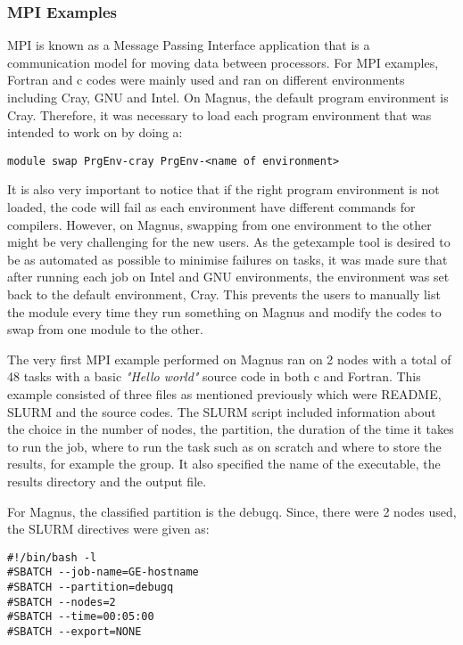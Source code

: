 \subsubsection{MPI Examples}

MPI is known as a Message Passing Interface application that is a communication model for moving data between processors. For MPI examples, Fortran and 
c codes were mainly used and ran on different environments including Cray, GNU and Intel. On Magnus, the default program environment is Cray. Therefore, 
it was necessary to load each program environment that was intended to work on by doing a:

\begin{tcolorbox}
\begin{Verbatim}[fontsize=\scriptsize]
module swap PrgEnv-cray PrgEnv-<name of environment>
\end{Verbatim}
\end{tcolorbox}

It is also very important to notice that if the right program environment is not loaded, the code will fail as each environment have different commands 
for compilers. However, on Magnus, swapping from one environment to the other might be very challenging for the new users. As the getexample tool is
desired to be as automated as possible to minimise failures on tasks, it was made sure that after running each job on Intel and GNU environments, the
environment was set back to the default environment, Cray. This prevents the users to manually list the module every time they run something on Magnus
and modify the codes to swap from one module to the other. 

The very first MPI example performed on Magnus ran on 2 nodes with a total of 48 tasks with a basic \emph{"Hello world"} source code in both c and Fortran. 
This example consisted of three files as mentioned previously which were README, SLURM and the source codes. The SLURM script included information about
the choice in the number of nodes, the partition, the duration of the time it takes to run the job, where to run the task such as on scratch and where
to store the results, for example the group. It also specified the name of the executable, the results directory and the output file. 

For Magnus, the classified partition is the debugq. Since, there were 2 nodes used, the SLURM directives were given as:

\begin{tcolorbox}
\begin{Verbatim}[fontsize=\scriptsize]
#!/bin/bash -l
#SBATCH --job-name=GE-hostname
#SBATCH --partition=debugq
#SBATCH --nodes=2
#SBATCH --time=00:05:00
#SBATCH --export=NONE
\end{Verbatim}
\end{tcolorbox}


